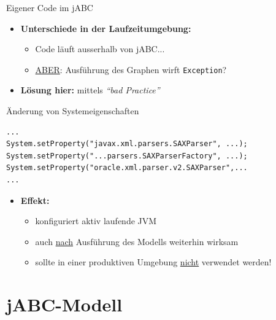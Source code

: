 \begin{frame}[fragile]{Eigener Code im jABC}
\begin{itemize}
	\item \textbf{Unterschiede in der Laufzeitumgebung:} 
	\begin{itemize}
			\item Code läuft ausserhalb von jABC...
			\item \underline{ABER}: Ausführung des Graphen wirft \texttt{Exception}?
	\end{itemize}
	\pause
	\item \textbf{Lösung hier:} mittels \textit{"`bad Practice"'}
\end{itemize}

\begin{block}{Änderung von Systemeigenschaften}
\javalstset
\begin{lstlisting}
...
System.setProperty("javax.xml.parsers.SAXParser", ...);
System.setProperty("...parsers.SAXParserFactory", ...);
System.setProperty("oracle.xml.parser.v2.SAXParser",...
...
\end{lstlisting}
\end{block}

\begin{itemize}
	\item \textbf{Effekt:}
		\begin{itemize}
			\item konfiguriert aktiv laufende JVM
			\item auch \underline{nach} Ausführung des Modells weiterhin wirksam
			\item sollte in einer produktiven Umgebung \underline{nicht} verwendet werden!
		\end{itemize}
\end{itemize}
\end{frame}


\section{jABC-Modell}

